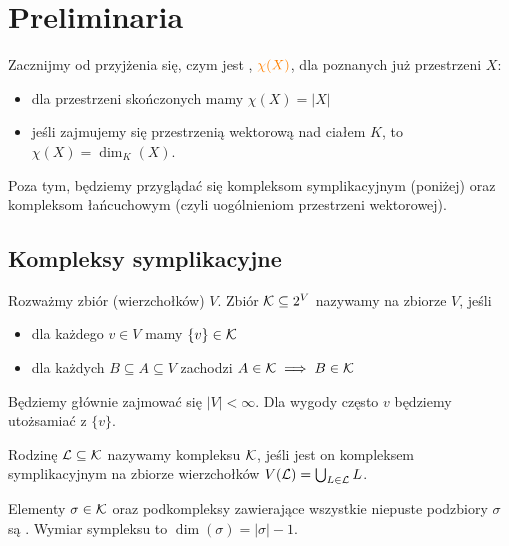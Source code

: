 \section{Preliminaria}

Zacznijmy od przyjżenia się, czym jest , $\color{orange}\chi(X)$, dla poznanych już przestrzeni $X$:

\begin{itemize}
  \item dla przestrzeni skończonych mamy $\chi(X)=|X|$
  \item jeśli zajmujemy się przestrzenią wektorową nad ciałem $K$, to $\chi(X)=\dim_K(X)$.
\end{itemize}

Poza tym, będziemy przyglądać się kompleksom symplikacyjnym (poniżej) oraz kompleksom łańcuchowym (czyli uogólnieniom przestrzeni wektorowej).

\subsection{Kompleksy symplikacyjne}

\begin{definition}
  Rozważmy zbiór (wierzchołków) $V$. Zbiór $\mathcal{K}\subseteq 2^V$ nazywamy  na zbiorze $V$, jeśli

  \begin{itemize}
    \item dla każdego $v\in V$ mamy $\{v\}\in \mathcal{K}$
    \item dla każdych $B\subseteq A\subseteq V$ zachodzi $A\in\mathcal{K}\implies B\in\mathcal{K}$
  \end{itemize}
\end{definition}

Będziemy głównie zajmować się $|V|<\infty$. Dla wygody często $v$ będziemy utożsamiać z $\{v\}$.

Rodzinę $\mathcal{L}\subseteq\mathcal{K}$ nazywamy  kompleksu $\mathcal{K}$, jeśli jest on kompleksem symplikacyjnym na zbiorze wierzchołków $V(\mathcal{L})=\bigcup_{L\in\mathcal{L}}L$.

\begin{definition}[Sympleks]
  Elementy $\sigma\in\mathcal{K}$ oraz podkompleksy zawierające wszystkie niepuste podzbiory $\sigma$ są . Wymiar sympleksu to $\dim(\sigma)=|\sigma|-1$.
\end{definition}

